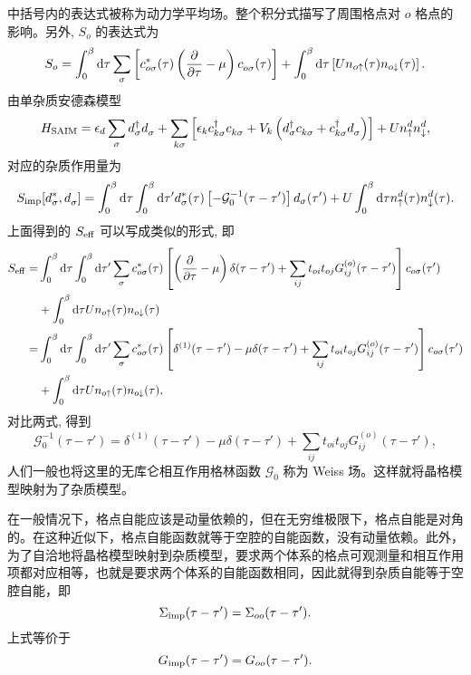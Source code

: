 中括号内的表达式被称为动力学平均场。整个积分式描写了周围格点对 $o$ 格点的影响。另外, $S_o$ 的表达式为 
\begin{equation}
    S_o=\int_0^\beta\mathrm{d}\tau\sum_\sigma\left[ c_{o\sigma}^*(\tau)\left( \frac{\partial}{\partial \tau}-\mu \right) c_{o\sigma}^{ }(\tau) \right]+\int_0^\beta\mathrm{d}\tau\left[ U n_{o\uparrow}(\tau)n_{o\downarrow}(\tau) \right].
\end{equation} 
由单杂质安德森模型 
\begin{equation}
    H_{\mathrm{SAIM}}=\epsilon_d\sum_\sigma d_\sigma^\dagger d_\sigma^{ }+\sum_{k\sigma}\left[ \epsilon_k c_{k\sigma}^{\dagger} c_{k\sigma}^{ }+V_k\left( d_\sigma^\dagger c_{k\sigma}^{ }+c_{k\sigma}^\dagger d_\sigma^{ } \right) \right]+U n_{\uparrow}^d n_{\downarrow}^d, 
\end{equation}
对应的杂质作用量为 
\begin{equation}
    S_{\mathrm{imp}}[d_\sigma^*,d_\sigma^{ }]=\int_0^\beta\mathrm{d}\tau\int_0^\beta\mathrm{d}\tau'd_\sigma^*(\tau)\left[ -\mathcal{G}^{-1}_0(\tau-\tau') \right] d_{\sigma}(\tau')+U\int_0^\beta\mathrm{d}\tau n_{\uparrow}^d(\tau)n_{\downarrow}^d(\tau).
\end{equation}
上面得到的 $S_{\mathrm{eff}}$ 可以写成类似的形式, 即
\begin{equation}
    \begin{aligned}
        S_{\mathrm{eff}}=&\int_0^\beta\mathrm{d}\tau \int_0^\beta\mathrm{d}\tau'\sum_\sigma c_{o\sigma}^*(\tau)\left[ \left( \frac{\partial}{\partial \tau}-\mu \right)\delta(\tau-\tau')+\sum_{ij}t_{oi}t_{oj}G_{ij}^{(o)}(\tau-\tau') \right] c_{o\sigma}(\tau')\\
        & +\int_0^\beta\mathrm{d}\tau Un_{o\uparrow}(\tau)n_{o\downarrow}(\tau)\\
        =&\int_0^\beta\mathrm{d}\tau \int_0^\beta\mathrm{d}\tau'\sum_\sigma c_{o\sigma}^*(\tau)\left[ \delta^{(1)}(\tau-\tau')-\mu\delta(\tau-\tau') +\sum_{ij}t_{oi}t_{oj}G_{ij}^{(o)}(\tau-\tau') \right] c_{o\sigma}(\tau')\\
        &+\int_0^\beta\mathrm{d}\tau Un_{o\uparrow}(\tau)n_{o\downarrow}(\tau),
    \end{aligned}
\end{equation}
对比两式, 得到 
\begin{equation}
    \mathcal{G}_0^{-1}(\tau-\tau')=\delta^{(1)}(\tau-\tau')-\mu\delta(\tau-\tau') +\sum_{ij}t_{oi}t_{oj}G_{ij}^{(o)}(\tau-\tau'),
\end{equation}
人们一般也将这里的无库仑相互作用格林函数 $\mathcal{G}_0$ 称为 Weiss 场。这样就将晶格模型映射为了杂质模型。

在一般情况下，格点自能应该是动量依赖的，但在无穷维极限下，格点自能是对角的。在这种近似下，格点自能函数就等于空腔的自能函数，没有动量依赖\cite{Hartmann1989}。此外，为了自洽地将晶格模型映射到杂质模型，要求两个体系的格点可观测量和相互作用项都对应相等，也就是要求两个体系的自能函数相同，因此就得到杂质自能等于空腔自能，即 
\begin{equation}
    \Sigma_{\mathrm{imp}}(\tau-\tau')=\Sigma_{oo}(\tau-\tau').\label{dmftscf1}
\end{equation}
上式等价于
\begin{equation}
    G_{\mathrm{imp}}(\tau-\tau')=G_{oo}(\tau-\tau').\label{dmftscf2}
\end{equation}

